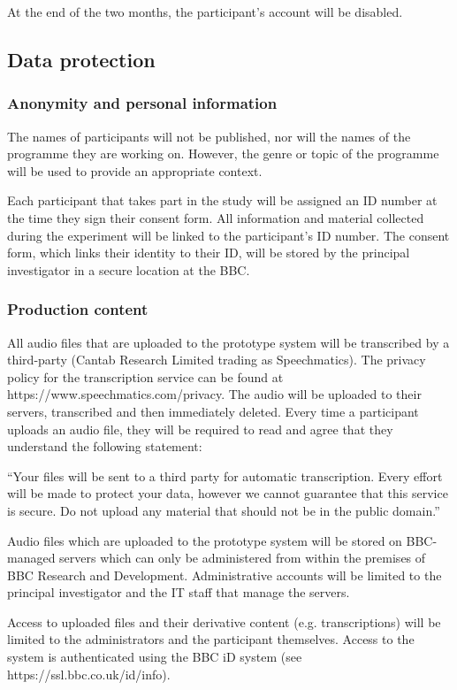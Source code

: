 At the end of the two months, the participant's account will be disabled.

\subsection{Data protection}
\subsubsection{Anonymity and personal information}
The names of participants will not be published, nor will the names of the
programme they are working on. However, the genre or topic of the programme
will be used to provide an appropriate context.

Each participant that takes part in the study will be assigned an ID number at
the time they sign their consent form. All information and material collected
during the experiment will be linked to the participant's ID number. The
consent form, which links their identity to their ID, will be stored by the
principal investigator in a secure location at the BBC.

\subsubsection{Production content}
All audio files that are uploaded to the prototype system will be transcribed
by a third-party (Cantab Research Limited trading as Speechmatics). The privacy
policy for the transcription service can be found at
https://www.speechmatics.com/privacy. The audio will be uploaded to their
servers, transcribed and then immediately deleted. Every time a participant
uploads an audio file, they will be required to read and agree that they
understand the following statement:

``Your files will be sent to a third party for automatic transcription. Every
effort will be made to protect your data, however we cannot guarantee that this
service is secure. Do not upload any material that should not be in the public
domain.''

Audio files which are uploaded to the prototype system will be stored on
BBC-managed servers which can only be administered from within the premises of
BBC Research and Development. Administrative accounts will be limited to the
principal investigator and the IT staff that manage the servers.

Access to uploaded files and their derivative content (e.g. transcriptions)
will be limited to the administrators and the participant themselves. Access to
the system is authenticated using the BBC iD system (see
https://ssl.bbc.co.uk/id/info).

